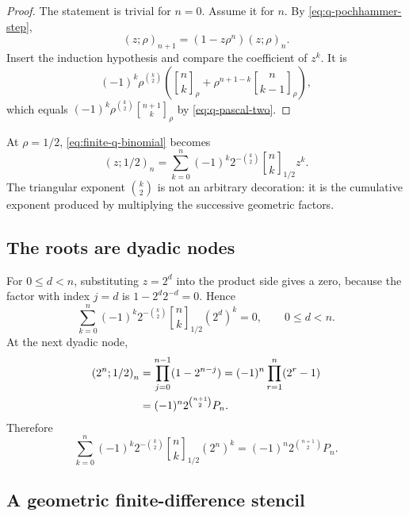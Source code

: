 \documentclass[11pt]{article}
\theoremstyle{definition}
\newcommand{\qpoch}[3]{\left(#1;#2\right)_{#3}}
\newcommand{\Qbin}[3]{\genfrac{[}{]}{0pt}{}{#1}{#2}_{#3}}
\begin{document}
\begin{proof}
The statement is trivial for $n=0$.  Assume it for $n$.  By
\cref{eq:q-pochhammer-step},
\[
  \qpoch{z}{\rho}{n+1}
  =(1-z\rho^n)\qpoch{z}{\rho}{n}.
\]
Insert the induction hypothesis and compare the coefficient of $z^k$.  It is
\[
  (-1)^k\rho^{\binom{k}{2}}
  \left(\Qbin{n}{k}{\rho}
  +\rho^{n+1-k}\Qbin{n}{k-1}{\rho}\right),
\]
which equals
$(-1)^k\rho^{\binom{k}{2}}\Qbin{n+1}{k}{\rho}$
by \cref{eq:q-pascal-two}.
\end{proof}

At $\rho=1/2$, \cref{eq:finite-q-binomial} becomes
\begin{equation}
  \qpoch{z}{1/2}{n}
  =\sum_{k=0}^{n}(-1)^k2^{-\binom{k}{2}}
     \Qbin{n}{k}{1/2}z^k.
  \label{eq:finite-half-q-binomial}
\end{equation}
The triangular exponent $\binom{k}{2}$ is not an arbitrary decoration: it is the cumulative exponent produced by multiplying the successive geometric factors.

\subsection{The roots are dyadic nodes}

For $0\le d<n$, substituting $z=2^d$ into the product side gives a zero, because the factor with index $j=d$ is $1-2^d2^{-d}=0$.  Hence
\begin{equation}
  \sum_{k=0}^{n}(-1)^k2^{-\binom{k}{2}}
  \Qbin{n}{k}{1/2}(2^d)^k=0,
  \qquad 0\le d<n.
  \label{eq:q-node-zero}
\end{equation}
At the next dyadic node,
\begin{align}
  \qpoch{2^n}{1/2}{n}
  &=\prod_{j=0}^{n-1}(1-2^{n-j})
    =(-1)^n\prod_{r=1}^{n}(2^r-1)\notag\\
  &=(-1)^n2^{\binom{n+1}{2}}P_n.
  \label{eq:q-node-endpoint}
\end{align}
Therefore
\begin{equation}
  \sum_{k=0}^{n}(-1)^k2^{-\binom{k}{2}}
  \Qbin{n}{k}{1/2}(2^n)^k
  =(-1)^n2^{\binom{n+1}{2}}P_n.
  \label{eq:q-node-endpoint-sum}
\end{equation}

\subsection{A geometric finite-difference stencil}
\end{document}
